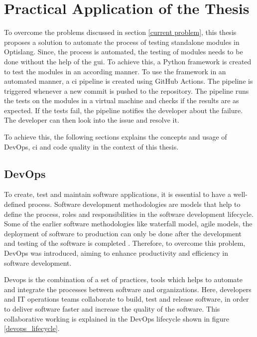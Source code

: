 \chapter{Practical Application of the Thesis}

To overcome the problems discussed in section \ref{current problem}, this thesis proposes a solution to automate the process of testing standalone modules
in Optislang. Since, the process is automated, the testing of modules needs to be done without the help of the \acrshort{gui}. To achieve this, a Python
\cite{python} framework is created to test the modules in an according manner. To use the framework in an automated manner, a \acrshort{ci} pipeline is created using GitHub Actions. The pipeline 
is triggered whenever a new commit is pushed to the repository. The pipeline runs the tests on the modules in a virtual machine and checks if the results are as expected. If the tests 
fail, the pipeline notifies the developer about the failure. The developer can then look into the issue and resolve it. 

To achieve this, the following sections explains the concepts and usage of DevOps, \acrlong{ci} and code quality in the context of this thesis.

\section{DevOps}
To create, test and maintain software applications, it is essential to have a well-defined process. Software development methodologies are models that help
to define the process, roles and responsibilities in the software development lifecycle. Some of the earlier software methodologies like waterfall model, agile
models, the deployment of software to production can only be done after the development and testing of the software is completed \cite{10616918}. Therefore, to 
overcome this problem, DevOps was introduced, aiming to enhance productivity and efficiency in software development.

Devops is the combination of a set of practices, tools which helps to automate and integrate the processes between software and organizations. Here, developers
and IT operations teams collaborate to build, test and release software, in order to deliver software faster and increase the quality of the software. This 
collaborative working is explained in the DevOps lifecycle shown in figure \ref{devops_lifecycle}.  

